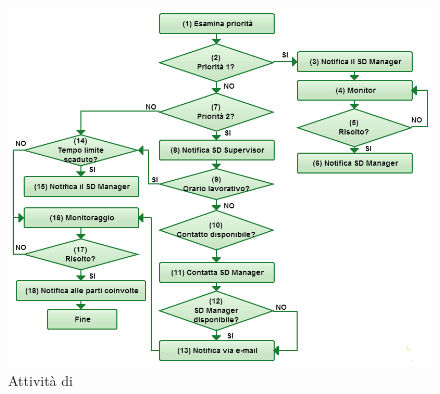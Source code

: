 \begin{figure}
\centering
\includegraphics[scale=0.3]{Images/Diagrams/Incident_Management_Escalation_Process.png}
\caption{Attività di }
\label{im-escalation-activities-img}
\end{figure}

